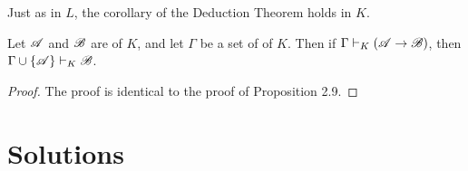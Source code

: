 Just as in \(L\), the corollary of the Deduction Theorem holds in \(K\).

\begin{proposition}
  Let \(\mathscr{A}\) and \(\mathscr{B}\) are \wfs{} of \(K\), and let \(\Gamma\) be a set of \wfs{} of \(K\). Then if \(\Gamma \vdash_{K} (\mathscr{A} \rightarrow \mathscr{B})\), then \(\Gamma \cup \{\mathscr{A}\} \vdash_{K} \mathscr{B}\).

  \begin{proof}
    The proof is identical to the proof of Proposition 2.9.
  \end{proof}
\end{proposition}

\section*{Solutions}

